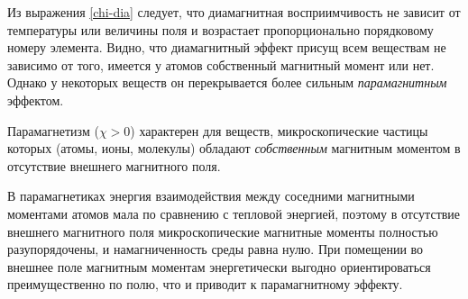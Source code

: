%
%
%


Из выражения \eqref{chi-dia} следует, что диамагнитная восприимчивость 
не зависит от температуры или величины поля
и возрастает пропорционально порядковому номеру элемента.
Видно, что диамагнитный эффект присущ всем веществам не зависимо от того, 
имеется у атомов собственный магнитный момент или нет. Однако у некоторых 
веществ он перекрывается более сильным \emph{парамагнитным} эффектом.


\label{sec:paramagnetism}

Парамагнетизм ($\chi>0$) характерен для веществ, микроскопические частицы которых 
(атомы, ионы, молекулы) обладают \emph{собственным} магнитным 
моментом в отсутствие внешнего магнитного поля.

В парамагнетиках энергия взаимодействия между соседними магнитными моментами
атомов мала по сравнению с тепловой энергией,
поэтому в отсутствие внешнего магнитного поля микроскопические магнитные моменты
полностью разупорядочены, и намагниченность среды равна нулю.
При помещении во внешнее поле магнитным моментам энергетически выгодно
ориентироваться преимущественно по полю, что и приводит к парамагнитному эффекту.

